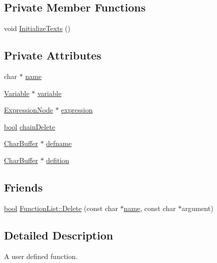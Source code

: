\subsection*{Private Member Functions}
\begin{DoxyCompactItemize}
\item 
void \hyperlink{classUserFunction_a5f22a558f8418f2ef6df952d88c7029b}{Initialize\+Texts} ()
\end{DoxyCompactItemize}
\subsection*{Private Attributes}
\begin{DoxyCompactItemize}
\item 
char $\ast$ \hyperlink{classUserFunction_a7cb07de0ad054d5001875aa2b3ad639d}{name}
\item 
\hyperlink{classVariable}{Variable} $\ast$ \hyperlink{classUserFunction_a43e22a8c48e1d4770b0c4eadc3254aa8}{variable}
\item 
\hyperlink{classExpressionNode}{Expression\+Node} $\ast$ \hyperlink{classUserFunction_ab7a0fb4f1265946883ef4e52dbe032f7}{expression}
\item 
\hyperlink{platform_8h_a1062901a7428fdd9c7f180f5e01ea056}{bool} \hyperlink{classUserFunction_a86fecef5db791181f188bef0d7898de0}{chain\+Delete}
\item 
\hyperlink{classCharBuffer}{Char\+Buffer} $\ast$ \hyperlink{classUserFunction_a722d65ef9f73e516689cb474e318b9f7}{defname}
\item 
\hyperlink{classCharBuffer}{Char\+Buffer} $\ast$ \hyperlink{classUserFunction_aa39d63ff3cb597dc0d97667743d21f77}{defition}
\end{DoxyCompactItemize}
\subsection*{Friends}
\begin{DoxyCompactItemize}
\item 
\hyperlink{platform_8h_a1062901a7428fdd9c7f180f5e01ea056}{bool} \hyperlink{classUserFunction_a3490258d5a76eb0d2688bcf121e5ab48}{Function\+List\+::\+Delete} (const char $\ast$\hyperlink{classUserFunction_a7cb07de0ad054d5001875aa2b3ad639d}{name}, const char $\ast$argument)
\end{DoxyCompactItemize}


\subsection{Detailed Description}
A user defined function. 

